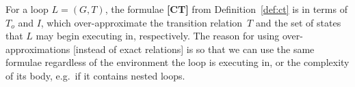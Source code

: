 \documentclass[preprint]{sigplanconf}
\theoremstyle{definition}
\begin{document}
%
For a loop $L=(G,T)$, the formulae {\bf [CT]} %
from Definition~\ref{def:ct} 
is in terms of 
$T_o$ and $I$, which over-approximate the transition relation~$T$ and the set of states that $L$ may begin executing in, respectively. 
The reason for using over-approximations [instead of exact relations] %
is so that we can use the same formulae regardless of the environment the loop is executing in, or 
the complexity of its body, e.g.~if it contains nested loops.
\end{document}
